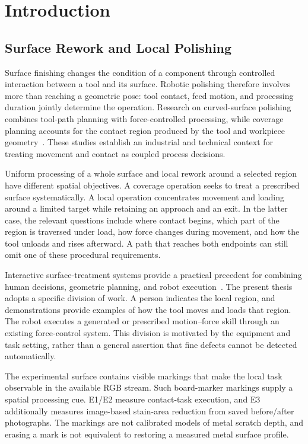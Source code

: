 \chapter{Introduction}
\label{chap:introduction}

\section{Surface Rework and Local Polishing}
Surface finishing changes the condition of a component through controlled interaction between a tool and its surface. Robotic polishing therefore involves more than reaching a geometric pose: tool contact, feed motion, and processing duration jointly determine the operation. Research on curved-surface polishing combines tool-path planning with force-controlled processing, while coverage planning accounts for the contact region produced by the tool and workpiece geometry~\cite{mohsin2019path,schneyer2023segmentation}. These studies establish an industrial and technical context for treating movement and contact as coupled process decisions.

Uniform processing of a whole surface and local rework around a selected region have different spatial objectives. A coverage operation seeks to treat a prescribed surface systematically. A local operation concentrates movement and loading around a limited target while retaining an approach and an exit. In the latter case, the relevant questions include where contact begins, which part of the region is traversed under load, how force changes during movement, and how the tool unloads and rises afterward. A path that reaches both endpoints can still omit one of these procedural requirements.

Interactive surface-treatment systems provide a practical precedent for combining human decisions, geometric planning, and robot execution~\cite{alt2024robogrind}. The present thesis adopts a specific division of work. A person indicates the local region, and demonstrations provide examples of how the tool moves and loads that region. The robot executes a generated or prescribed motion--force skill through an existing force-control system. This division is motivated by the equipment and task setting, rather than a general assertion that fine defects cannot be detected automatically.

The experimental surface contains visible markings that make the local task observable in the available RGB stream. Such board-marker markings supply a spatial processing cue. E1/E2 measure contact-task execution, and E3 additionally measures image-based stain-area reduction from saved before/after photographs. The markings are not calibrated models of metal scratch depth, and erasing a mark is not equivalent to restoring a measured metal surface profile.

